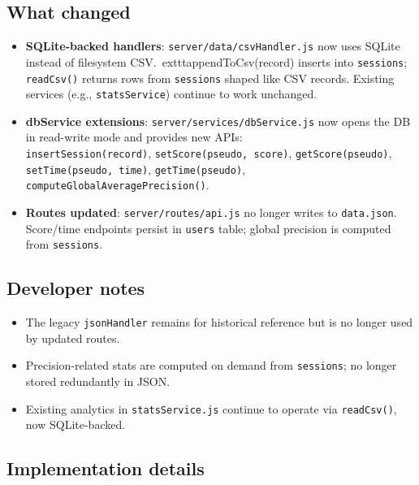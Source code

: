 \documentclass[11pt,a4paper]{article}
\begin{document}
\subsection{What changed}
\begin{itemize}[noitemsep]
  \item \textbf{SQLite-backed handlers}: \texttt{server/data/csvHandler.js} now uses SQLite instead of filesystem CSV.\
        	exttt{appendToCsv(record)} inserts into \texttt{sessions}; \texttt{readCsv()} returns rows from \texttt{sessions} shaped like CSV records. Existing services (e.g., \texttt{statsService}) continue to work unchanged.
  \item \textbf{dbService extensions}: \texttt{server/services/dbService.js} now opens the DB in read-write mode and provides new APIs: \\
        \quad \texttt{insertSession(record)}, \texttt{setScore(pseudo, score)}, \texttt{getScore(pseudo)}, \texttt{setTime(pseudo, time)}, \texttt{getTime(pseudo)}, \texttt{computeGlobalAveragePrecision()}.
  \item \textbf{Routes updated}: \texttt{server/routes/api.js} no longer writes to \texttt{data.json}. Score/time endpoints persist in \texttt{users} table; global precision is computed from \texttt{sessions}.
\end{itemize}

\subsection{Developer notes}
\begin{itemize}[noitemsep]
  \item The legacy \texttt{jsonHandler} remains for historical reference but is no longer used by updated routes.
  \item Precision-related stats are computed on demand from \texttt{sessions}; no longer stored redundantly in JSON.
  \item Existing analytics in \texttt{statsService.js} continue to operate via \texttt{readCsv()}, now SQLite-backed.
\end{itemize}

\subsection{Implementation details}
\end{document}
